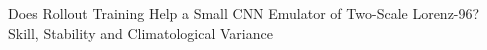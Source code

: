 Does Rollout Training Help a Small CNN Emulator of Two-Scale Lorenz-96? Skill, Stability and Climatological Variance
